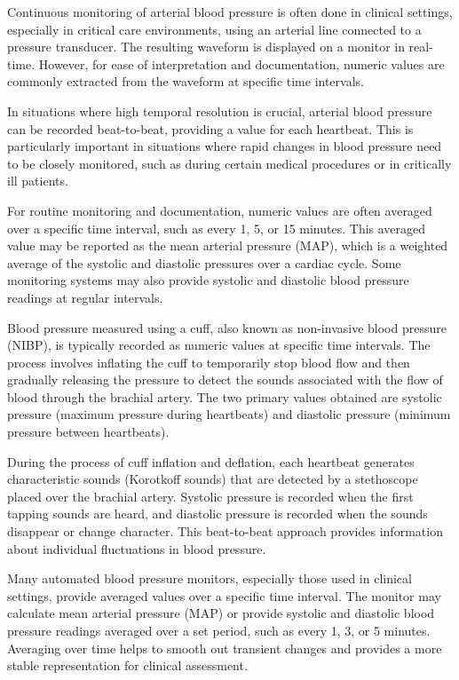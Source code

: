 \documentclass[10pt, bibliography=totoc]{scrartcl}
\begin{document}
Continuous monitoring of arterial blood pressure is often done in clinical settings, especially in critical care environments, using an arterial line connected to a pressure transducer. The resulting waveform is displayed on a monitor in real-time.
However, for ease of interpretation and documentation, numeric values are commonly extracted from the waveform at specific time intervals.

In situations where high temporal resolution is crucial, arterial blood pressure can be recorded beat-to-beat, providing a value for each heartbeat.
This is particularly important in situations where rapid changes in blood pressure need to be closely monitored, such as during certain medical procedures or in critically ill patients.

For routine monitoring and documentation, numeric values are often averaged over a specific time interval, such as every 1, 5, or 15 minutes.
This averaged value may be reported as the mean arterial pressure (MAP), which is a weighted average of the systolic and diastolic pressures over a cardiac cycle.
Some monitoring systems may also provide systolic and diastolic blood pressure readings at regular intervals.

Blood pressure measured using a cuff, also known as non-invasive blood pressure (NIBP), is typically recorded as numeric values at specific time intervals. The process involves inflating the cuff to temporarily stop blood flow and then gradually releasing the pressure to detect the sounds associated with the flow of blood through the brachial artery. The two primary values obtained are systolic pressure (maximum pressure during heartbeats) and diastolic pressure (minimum pressure between heartbeats).

During the process of cuff inflation and deflation, each heartbeat generates characteristic sounds (Korotkoff sounds) that are detected by a stethoscope placed over the brachial artery.
Systolic pressure is recorded when the first tapping sounds are heard, and diastolic pressure is recorded when the sounds disappear or change character.
This beat-to-beat approach provides information about individual fluctuations in blood pressure.

Many automated blood pressure monitors, especially those used in clinical settings, provide averaged values over a specific time interval.
The monitor may calculate mean arterial pressure (MAP) or provide systolic and diastolic blood pressure readings averaged over a set period, such as every 1, 3, or 5 minutes.
Averaging over time helps to smooth out transient changes and provides a more stable representation for clinical assessment.
\end{document}
